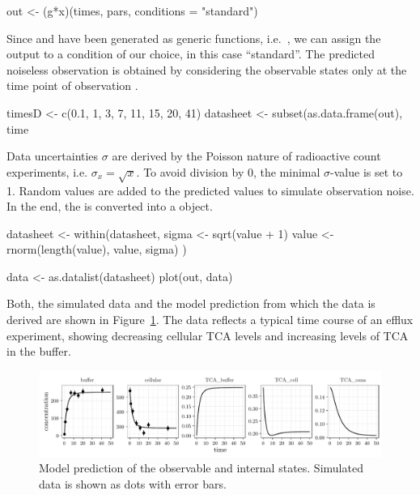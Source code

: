 \documentclass[article]{jss}
\begin{document}
\begin{CodeChunk}
\begin{CodeInput}
  out <- (g*x)(times, pars, conditions = "standard")
\end{CodeInput}
\end{CodeChunk}
Since  and  have been generated as generic functions, i.e.~, we can assign the output to a condition of our choice, in this case ``standard''.
The predicted noiseless observation is obtained by considering the observable states only at the time point of observation .
\begin{CodeChunk}
\begin{CodeInput}
  timesD <- c(0.1, 1, 3, 7, 11, 15, 20, 41)
  datasheet <- subset(as.data.frame(out),
                      time %
\end{CodeInput}
\end{CodeChunk}

Data uncertainties $\sigma$ are derived by the Poisson nature of radioactive count experiments, i.e. $\sigma_x = \sqrt{x}$. To avoid division by 0, the minimal $\sigma$-value is set to 1. Random values are added to the predicted values to simulate observation noise. In the end, the  is converted into a  object.


\begin{CodeChunk}
\begin{CodeInput}
  datasheet <- within(datasheet, {
	  sigma <- sqrt(value + 1)
	  value <- rnorm(length(value), value, sigma)
  })

  data <- as.datalist(datasheet)
  plot(out, data)
\end{CodeInput}
\end{CodeChunk}
Both, the simulated data and the model prediction from which the data is derived are shown in Figure~\ref{fig:observation}. The data reflects a typical time course of an efflux experiment, showing decreasing cellular TCA levels and increasing levels of TCA in the buffer.
\begin{figure}[ht]
	\centering
	\includegraphics[width = \textwidth]{images/figure2}
	\caption{Model prediction of the observable and internal states. Simulated data is shown as dots with error bars.}
	\label{fig:observation}
\end{figure}
\end{document}
